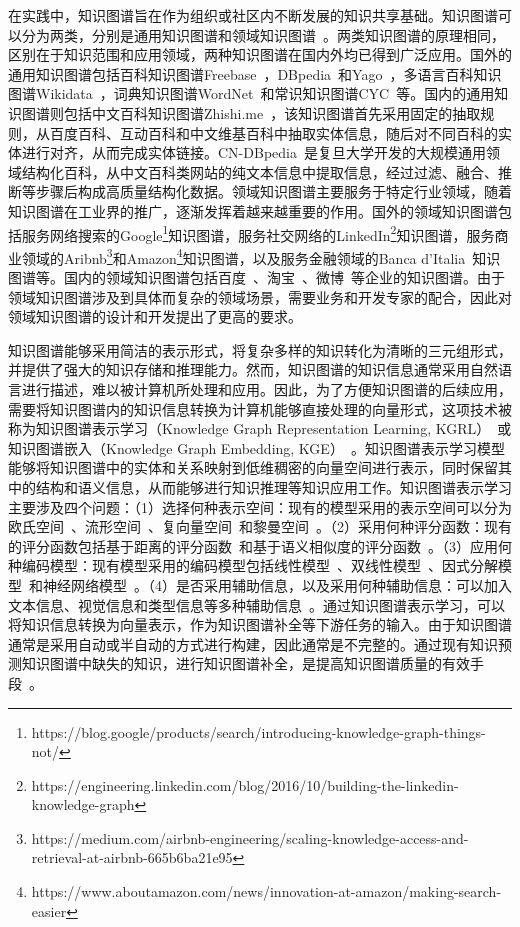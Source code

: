 \documentclass[algorithmlist, AutoFakeBold, AutoFakeSlant, figurelist, tablelist, nomlist, engineering]{seuthesix}
\begin{document}
在实践中，知识图谱旨在作为组织或社区内不断发展的知识共享基础。知识图谱可以分为两类，分别是通用知识图谱和领域知识图谱~\cite{hogan2021knowledge}。两类知识图谱的原理相同，区别在于知识范围和应用领域，两种知识图谱在国内外均已得到广泛应用。国外的通用知识图谱包括百科知识图谱Freebase~\cite{bollacker2007platform}，DBpedia~\cite{lehmann2015dbpedia}和Yago~\cite{hoffart2011yago2}，多语言百科知识图谱Wikidata~\cite{vrandevcic2014wikidata}，词典知识图谱WordNet~\cite{miller2007wordnet}和常识知识图谱CYC~\cite{lenat1995cyc}等。国内的通用知识图谱则包括中文百科知识图谱Zhishi.me~\cite{niu2011zhishi}，该知识图谱首先采用固定的抽取规则，从百度百科、互动百科和中文维基百科中抽取实体信息，随后对不同百科的实体进行对齐，从而完成实体链接。CN-DBpedia~\cite{xu2017cn}是复旦大学开发的大规模通用领域结构化百科，从中文百科类网站的纯文本信息中提取信息，经过过滤、融合、推断等步骤后构成高质量结构化数据。领域知识图谱主要服务于特定行业领域，随着知识图谱在工业界的推广，逐渐发挥着越来越重要的作用。国外的领域知识图谱包括服务网络搜索的Google\footnote{https://blog.google/products/search/introducing-knowledge-graph-things-not/}知识图谱，服务社交网络的LinkedIn\footnote{https://engineering.linkedin.com/blog/2016/10/building-the-linkedin-knowledge-graph}知识图谱，服务商业领域的Aribnb\footnote{https://medium.com/airbnb-engineering/scaling-knowledge-access-and-retrieval-at-airbnb-665b6ba21e95}和Amazon\footnote{https://www.aboutamazon.com/news/innovation-at-amazon/making-search-easier}知识图谱，以及服务金融领域的Banca d’Italia~\cite{bellomarini2019knowledge}知识图谱等。国内的领域知识图谱包括百度~\cite{wang2013xlore}、淘宝~\cite{xu2021alime}、微博~\cite{wei2020analysis}等企业的知识图谱。由于领域知识图谱涉及到具体而复杂的领域场景，需要业务和开发专家的配合，因此对领域知识图谱的设计和开发提出了更高的要求。

知识图谱能够采用简洁的表示形式，将复杂多样的知识转化为清晰的三元组形式，并提供了强大的知识存储和推理能力。然而，知识图谱的知识信息通常采用自然语言进行描述，难以被计算机所处理和应用。因此，为了方便知识图谱的后续应用，需要将知识图谱内的知识信息转换为计算机能够直接处理的向量形式，这项技术被称为知识图谱表示学习（Knowledge Graph Representation Learning, KGRL）~\cite{chen2022rlpath}或知识图谱嵌入（Knowledge Graph Embedding, KGE）~\cite{wang2021transet}。知识图谱表示学习模型能够将知识图谱中的实体和关系映射到低维稠密的向量空间进行表示，同时保留其中的结构和语义信息，从而能够进行知识推理等知识应用工作。知识图谱表示学习主要涉及四个问题：（1）选择何种表示空间：现有的模型采用的表示空间可以分为欧氏空间~\cite{lu2022dense}、流形空间~\cite{ebisu2018toruse}、复向量空间~\cite{trouillon2016complex}和黎曼空间~\cite{pan2021hyperbolic}。（2）采用何种评分函数：现有的评分函数包括基于距离的评分函数~\cite{sachan2020knowledge}和基于语义相似度的评分函数~\cite{xiao2017ssp}。（3）应用何种编码模型：现有模型采用的编码模型包括线性模型~\cite{peng2020lineare}、双线性模型~\cite{pan2021hyperbolic}、因式分解模型~\cite{ji2015knowledge}和神经网络模型~\cite{jiang2021kernel}。（4）是否采用辅助信息，以及采用何种辅助信息：可以加入文本信息、视觉信息和类型信息等多种辅助信息~\cite{wang2017knowledge}。通过知识图谱表示学习，可以将知识信息转换为向量表示，作为知识图谱补全等下游任务的输入。由于知识图谱通常是采用自动或半自动的方式进行构建，因此通常是不完整的。通过现有知识预测知识图谱中缺失的知识，进行知识图谱补全，是提高知识图谱质量的有效手段~\cite{vu2019capsule}。
\end{document}
